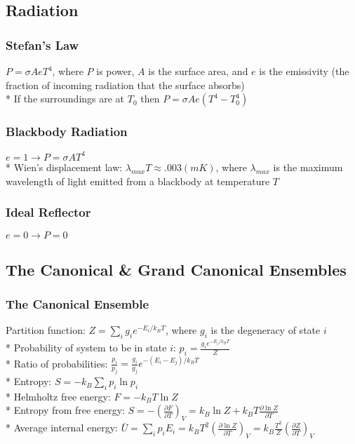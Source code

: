 \subsection{Radiation}
\subsubsection{Stefan's Law}
\(P=\sigma A e T^4\), where \(P\) is power,  \(A\) is the surface area, and \(e\) is the emissivity (the fraction of incoming radiation that the surface absorbs)\\*
If the surroundings are at \(T_0\) then \(P=\sigma A e (T^4-T_0^4)\)

\subsubsection{Blackbody Radiation}
\(e=1 \rightarrow P=\sigma A T^4\)\\*
Wien's displacement law: \(\lambda_{max} T\approx.003(mK)\), where \(\lambda_{max}\) is the maximum wavelength of light emitted from a blackbody at temperature \(T\)

\subsubsection{Ideal Reflector}
\(e=0\rightarrow P=0\)

\subsection{The Canonical \& Grand Canonical Ensembles}

\subsubsection{The Canonical Ensemble}
Partition function: \(\displaystyle Z=\sum_i{g_ie^{-E_i/k_BT}}\), where \(g_i\) is the degeneracy of state \(i\)\\*
Probability of system to be in state \(i\): \(\displaystyle p_i=\frac{g_ie^{-E_i/k_BT}}{Z}\)\\*
Ratio of probabilities: \(\displaystyle \frac{p_i}{p_j}=\frac{g_i}{g_j}e^{-(E_i-E_j)/k_BT}\)\\*
Entropy: \(\displaystyle S=-k_B\sum_i{p_i\ln{p_i}}\)\\*
Helmholtz free energy: \(F=-k_BT\ln{Z}\)\\*
Entropy from free energy: \(\displaystyle S=-\left(\frac{\partial F}{\partial T}\right)_V=k_B\ln{Z}+k_BT\frac{\partial\ln{Z}}{\partial T}\)\\*
Average internal energy: \(\displaystyle \bar{U}=\sum_i{p_iE_i}=k_BT^2\left(\frac{\partial\ln{Z}}{\partial T}\right)_V=k_B\frac{T^2}{Z}\left(\frac{\partial Z}{\partial T}\right)_V\)

